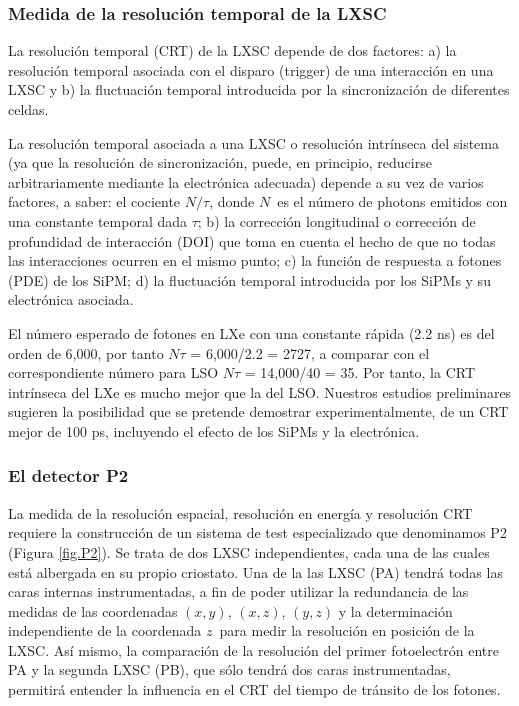 \subsubsection*{Medida de la resolución temporal de la LXSC}

La resolución temporal (CRT) de la LXSC depende de dos factores: a) la resolución temporal asociada con el disparo (trigger) de una interacción en una LXSC y b) la fluctuación temporal introducida por la sincronización de diferentes celdas.

La resolución temporal asociada a una LXSC o resolución intrínseca del sistema (ya que la resolución de sincronización, puede, en principio, reducirse arbitrariamente mediante la electrónica adecuada) depende a su vez de varios factores, a saber: el cociente $N/\tau$, donde $N$~es el número de photons emitidos con una constante temporal dada $\tau$; b) la corrección longitudinal o corrección de profundidad de interacción (DOI) que toma en cuenta el hecho de que no todas las interacciones ocurren en el mismo punto; c) la función de respuesta a fotones (PDE) de los SiPM; d) la fluctuación temporal introducida por los SiPMs y su electrónica asociada. 

El número esperado de fotones en LXe con una constante rápida (2.2 ns) es del orden de 6,000, por tanto  $N\tau$ = 6,000/2.2 = 2727, a comparar con el correspondiente número para LSO $N\tau$ = 14,000/40 = 35. Por tanto, la CRT intrínseca del LXe es mucho mejor que la del LSO.  Nuestros estudios preliminares sugieren la posibilidad que se pretende demostrar experimentalmente, de un CRT  mejor de 100 ps, incluyendo el efecto de los SiPMs y la electrónica. 

\subsubsection*{El detector P2}
La medida de la resolución espacial, resolución en energía y resolución CRT requiere la construcción de un sistema de test especializado que denominamos P2 (Figura \ref{fig.P2}). Se trata de dos LXSC independientes, cada una de las cuales está albergada en su propio criostato. Una de la las LXSC (PA) tendrá todas las caras internas instrumentadas, a fin de poder utilizar la redundancia de las medidas de las coordenadas $(x,y)$, $(x,z)$, $(y,z)$ y la determinación independiente de la coordenada $z$~para medir la resolución en posición de la LXSC. Así mismo, la comparación de la resolución del primer fotoelectrón entre PA y la segunda LXSC (PB), que sólo tendrá dos caras instrumentadas, permitirá entender la influencia en el CRT del tiempo de tránsito de los fotones.  


